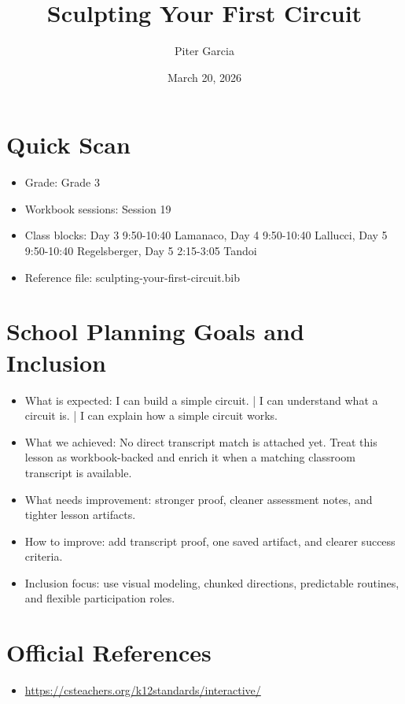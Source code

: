 \documentclass[11pt]{article}
\title{Sculpting Your First Circuit}
\author{Piter Garcia}
\date{March 20, 2026}
\begin{document}
\maketitle
\section*{Quick Scan}
\begin{itemize}[leftmargin=*]
\item Grade: Grade 3
\item Workbook sessions: Session 19
\item Class blocks: Day 3 9:50-10:40 Lamanaco, Day 4 9:50-10:40 Lallucci, Day 5 9:50-10:40 Regelsberger, Day 5 2:15-3:05 Tandoi
\item Reference file: sculpting-your-first-circuit.bib
\end{itemize}
\section*{School Planning Goals and Inclusion}
\begin{itemize}[leftmargin=*]
\item What is expected: I can build a simple circuit. | I can understand what a circuit is. | I can explain how a simple circuit works.
\item What we achieved: No direct transcript match is attached yet. Treat this lesson as workbook-backed and enrich it when a matching classroom transcript is available.
\item What needs improvement: stronger proof, cleaner assessment notes, and tighter lesson artifacts.
\item How to improve: add transcript proof, one saved artifact, and clearer success criteria.
\item Inclusion focus: use visual modeling, chunked directions, predictable routines, and flexible participation roles.
\end{itemize}
\section*{Official References}
\begin{itemize}[leftmargin=*]
\item \url{https://csteachers.org/k12standards/interactive/}

\end{itemize}
\end{document}
